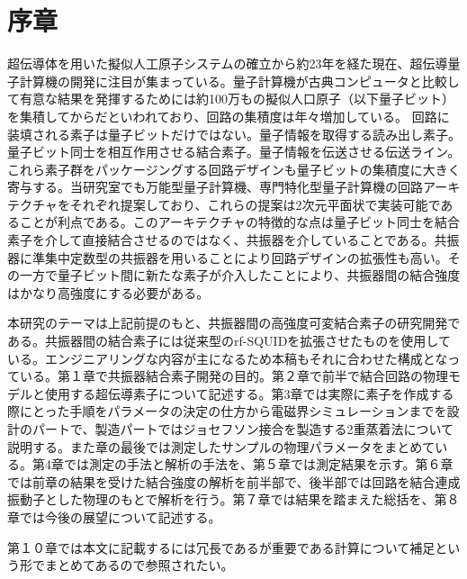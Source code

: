\section*{序章}
超伝導体を用いた擬似人工原子システムの確立\cite*{nakamura1999coherent}から約23年を経た現在、超伝導量子計算機の開発に注目が集まっている。量子計算機が古典コンピュータと比較して有意な結果を発揮するためには約100万もの擬似人口原子（以下量子ビット）を集積してからだといわれており、回路の集積度は年々増加している。
回路に装填される素子は量子ビットだけではない。量子情報を取得する読み出し素子。量子ビット同士を相互作用させる結合素子。量子情報を伝送させる伝送ライン。これら素子群をパッケージングする回路デザインも量子ビットの集積度に大きく寄与する。当研究室でも万能型量子計算機、専門特化型量子計算機の回路アーキテクチャ\cite*{Mukai2019}をそれぞれ提案しており、これらの提案は2次元平面状で実装可能であることが利点である。このアーキテクチャの特徴的な点は量子ビット同士を結合素子を介して直接結合させるのではなく、共振器を介していることである。共振器に準集中定数型の共振器を用いることにより回路デザインの拡張性も高い。その一方で量子ビット間に新たな素子が介入したことにより、共振器間の結合強度はかなり高強度にする必要がある。

本研究のテーマは上記前提のもと、共振器間の高強度可変結合素子の研究開発である。共振器間の結合素子には従来型のrf-SQUIDを拡張させたものを使用している。エンジニアリングな内容が主になるため本稿もそれに合わせた構成となっている。第１章で共振器結合素子開発の目的。第２章で前半で結合回路の物理モデルと使用する超伝導素子について記述する。第3章では実際に素子を作成する際にとった手順をパラメータの決定の仕方から電磁界シミュレーションまでを設計のパートで、製造パートではジョセフソン接合を製造する2重蒸着法について説明する。また章の最後では測定したサンプルの物理パラメータをまとめている。第4章では測定の手法と解析の手法を、第５章では測定結果を示す。第６章では前章の結果を受けた結合強度の解析を前半部で、後半部では回路を結合連成振動子とした物理のもとで解析を行う。第７章では結果を踏まえた総括を、第８章では今後の展望について記述する。

第１０章では本文に記載するには冗長であるが重要である計算について補足という形でまとめてあるので参照されたい。